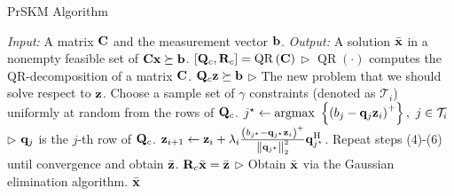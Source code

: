 \documentclass[12pt,draftcls,onecolumn]{IEEEtran}
\begin{document}
\begin{algorithm}[t]
\caption{PrSKM Algorithm}
\label{algorithm_1}
\begin{algorithmic}[1]
\Statex \emph{Input:} A matrix $\mathbf{C}$ and the measurement vector $\mathbf{b}$.
\Statex \emph{Output:} A solution $\bar{\mathbf{x}}$ in a nonempty feasible set of $\mathbf{C}\mathbf{x}\succeq\mathbf{b}$.
\State $\left[\mathbf{Q}_{c},\mathbf{R}_{c}\right]=\operatorname{QR}\left(\mathbf{C}\right)$ $\triangleright$ $\operatorname{QR}(\cdot)$ computes the QR-decomposition of a matrix $\mathbf{C}$.
\State $\mathbf{Q}_{c}\mathbf{z}\succeq\mathbf{b}$ $\triangleright$ The new problem that we should solve respect to $\mathbf{z}$.
\State Choose a sample set of $\gamma$ constraints (denoted as $\mathcal{T}_{i}$) uniformly at random from the rows of $\mathbf{Q}_{c}$.
\State $j^{\star}\gets\operatorname{argmax}~\left\{ \left(b_{j}-\mathbf{q}_{j}\mathbf{z}_{i}\right)^{+}\right\},~j\in\mathcal{T}_{i}$ $\triangleright$ $\mathbf{q}_{j}$ is the $j$-th row of $\mathbf{Q}_{c}$.
\State $\mathbf{z}_{i+1}\gets\mathbf{z}_{i}+\lambda_{i}\frac{\left(b_{j^{\star}}-\mathbf{q}_{j^{\star}}\mathbf{z}_{i}\right)^{+}}{\left\|\mathbf{q}_{j^\star}\right\|^{2}_{2}} \mathbf{q}^{\mathrm{H}}_{j^{\star}}$.
\State Repeat steps (4)-(6) until convergence and obtain $\bar{\mathbf{z}}$.
\State $\mathbf{R}_{c}\bar{\mathbf{x}}=\bar{\mathbf{z}}$ $\triangleright$ Obtain $\bar{\mathbf{x}}$ via the Gaussian elimination algorithm.
\State \Return $\bar{\mathbf{x}}$
\end{algorithmic}
\end{algorithm}

\end{document}
